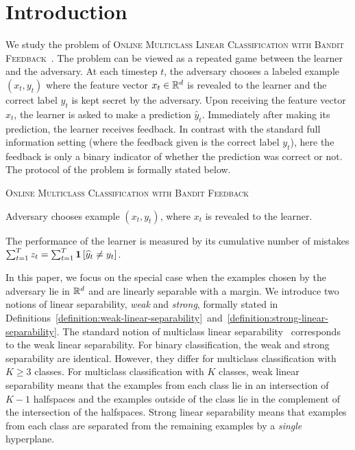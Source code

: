 \section{Introduction}
\label{section:introduction}

We study the problem of \textsc{Online Multiclass Linear Classification with
Bandit Feedback}~\citep{Kakade-Shalev-Shwartz-Tewari-2008}. The problem can be
viewed as a repeated game between the learner and the adversary. At each
timestep $t$, the adversary chooses a labeled example $(x_t, y_t)$ where the
feature vector $x_t \in \mathbb{R}^d$ is revealed to the learner and the correct label
$y_t$ is kept secret by the adversary. Upon receiving the feature vector $x_t$,
the learner is asked to make a prediction $\widehat{y}_t$. Immediately after
making its prediction, the learner receives feedback. In contrast with the
standard full information setting (where the feedback given is the correct label
$y_t$), here the feedback is only a binary indicator of whether the prediction
was correct or not. The protocol of the problem is formally stated below.

\begin{protocol}[h]
\caption{\textsc{Online Multiclass Classification with Bandit Feedback }
\label{algorithm:game-protocol}}
\begin{algorithmic}[1]
{
\STATE Adversary chooses example $(x_t, y_t)$, where $x_t$ is revealed to the learner.
\ENDFOR
}
\end{algorithmic}
\end{protocol}

The performance of the learner is measured by its cumulative number of
mistakes $\sum_{t=1}^T z_t = \sum_{t=1}^T \mathbf{1}\left[\widehat y_t \neq y_t \right]$.

In this paper, we focus on the special case when the examples chosen by the
adversary lie in $\mathbb{R}^d$ and are linearly separable with a margin. We introduce
two notions of linear separability, \emph{weak} and \emph{strong}, formally
stated in
Definitions~\ref{definition:weak-linear-separability}~and~\ref{definition:strong-linear-separability}.
The standard notion of multiclass linear separability~\citep[See e.g.][]{Crammer-Singer-2003}
corresponds to the weak
linear separability. For binary classification, the weak and strong separability
are identical. However, they differ for multiclass classification with $K \ge 3$
classes. For multiclass classification with $K$ classes, weak linear
separability means that the examples from each class lie in an intersection of
$K-1$ halfspaces and the examples outside of the class lie in the complement of
the intersection of the halfspaces. Strong linear separability means that
examples from each class are separated from the remaining examples by a
\emph{single} hyperplane.

